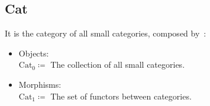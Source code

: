 \subsection{Cat}
\begin{definition}
  It is the category of all small categories, composed
  by~\parencite[p.~77]{leinster:basic_category_theory}:
  \begin{itemize}
    \item Objects:\\
      $\mathrm{Cat}_0 \coloneqq$ The collection of all small categories.
    \item Morphisms:\\
      $\mathrm{Cat}_1 \coloneqq$ The set of functors between categories.
  \end{itemize}
\end{definition}
